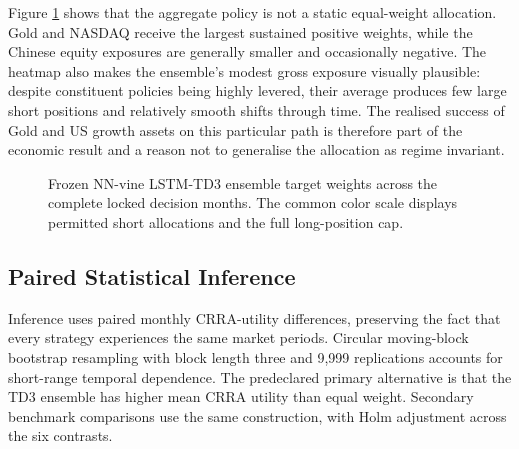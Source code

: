 Figure \ref{fig:primary_allocation_heatmap} shows that the aggregate policy is not a static equal-weight allocation. Gold and NASDAQ receive the largest sustained positive weights, while the Chinese equity exposures are generally smaller and occasionally negative. The heatmap also makes the ensemble's modest gross exposure visually plausible: despite constituent policies being highly levered, their average produces few large short positions and relatively smooth shifts through time. The realised success of Gold and US growth assets on this particular path is therefore part of the economic result and a reason not to generalise the allocation as regime invariant.

\begin{figure}[htbp]
\centering

\caption{Frozen NN-vine LSTM-TD3 ensemble target weights across the complete locked decision months. The common color scale displays permitted short allocations and the full long-position cap.}
\label{fig:primary_allocation_heatmap}
\end{figure}

\subsection{Paired Statistical Inference}
\label{subsec:4_inference}

Inference uses paired monthly CRRA-utility differences, preserving the fact that every strategy experiences the same market periods. Circular moving-block bootstrap resampling with block length three and 9,999 replications accounts for short-range temporal dependence. The predeclared primary alternative is that the TD3 ensemble has higher mean CRRA utility than equal weight. Secondary benchmark comparisons use the same construction, with Holm adjustment across the six contrasts.

